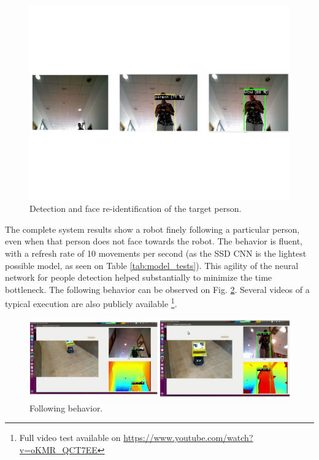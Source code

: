 \begin{figure}[h!]
	\centering
	\includegraphics[width=12cm]{images/exp_tracking}
	\caption{Detection and face re-identification of the target person.}
	\label{fig:exp_figures}
\end{figure}

The complete system results show a robot finely following a particular person, even when that person does not face towards the robot. The behavior is fluent, with a refresh rate of 10 movements per second (as the SSD CNN is the lightest possible model, as seen on Table \ref{tab:model_tests}). This agility of the neural network for people detection helped substantially to minimize the time bottleneck. The following behavior can be observed on Fig. \ref{fig:exp_following}. Several videos of a typical execution are also publicly available \footnote{Full video test available on \url{https://www.youtube.com/watch?v=oKMR_QCT7EE}}.

\begin{figure}[h!]
	\centering
	\includegraphics[width=12cm]{images/followperson_working2.png}
	\caption{Following behavior.}
	\label{fig:exp_following}
\end{figure}
